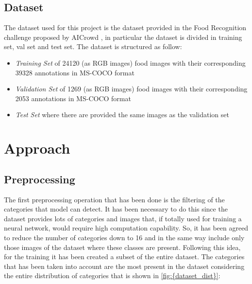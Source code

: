 \documentclass[a4paper,10pt]{report}
\begin{document}
{\section{Dataset}\label{sec:section-22}
The dataset used for this project is the dataset provided in the Food Recognition challenge proposed by AICrowd \cite{aicrowd}, in particular the dataset is divided in  training set, val set and test set. The dataset is structured as follow:
\begin{itemize}
    \item \emph{Training Set} of 24120 (as RGB images) food images with their corresponding 39328 annotations in MS-COCO format
    \item \emph{Validation Set} of 1269 (as RGB images) food images with their corresponding 2053 annotations in MS-COCO format
    \item \emph{Test Set} where there are provided the same images as the validation set
\end{itemize}
}




\chapter{Approach}\label{chap:chapter-3}

\section{Preprocessing}\label{sec:section-31}
The first preprocessing operation that has been done is the filtering of the categories that model can detect. It has been necessary to do this since the dataset provides lots of categories and images that, if totally used for training a neural network, would require high computation capability. So, it has been agreed to reduce the number of categories down to 16 and in the same way include only those images of the dataset where these classes are present. Following this idea, for the training it has been created a subset of the entire dataset. The categories that has been taken into account are the most present in the dataset considering the entire distribution of categories that is shown in \ref{fig:{dataset_dist}}:
\end{document}
